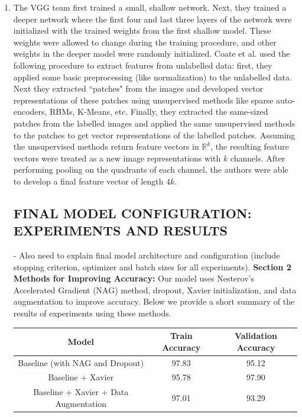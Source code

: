 \documentclass[a4paper]{article}
\begin{document}
\begin{enumerate}
{}
\item{ The VGG team first trained a small, shallow network. Next, they trained a deeper network where the first four and last three layers of the network were initialized with the trained weights from the first shallow model. These weights were allowed to change during the training procedure, and other weights in the deeper model were randomly initialized. 
\newline
\newline 
Coate et al. used the following procedure to extract features from unlabelled data: first, they applied some basic preprocessing (like normalization) to the unlabelled data. Next they extracted ``patches" from the images and developed vector representations of these patches using unsupervised methods like sparse auto-encoders, RBMs, K-Means, etc. Finally, they extracted the same-sized patches from the labelled images and applied the same unsupervised methods to the patches to get vector representations of the labelled patches. Assuming the unsupervised methods return feature vectors in $\mathbb{R}^k$, the resulting feature vectors were treated as a new image representations with $k$ channels. After performing pooling on the quadrants of each channel, the authors were able to develop a final feature vector of length $4k$. 

\subsection*{FINAL MODEL CONFIGURATION: EXPERIMENTS AND RESULTS}
- Also need to explain final model architecture and configuration (include stopping criterion, optimizer and batch sizes for all experiments).
\newline
\newline
\textbf{Section 2 Methods for Improving Accuracy:}
\newline
\newline
Our model uses Nesterov's Accelerated Gradient (NAG) method, dropout, Xavier initialization, and data augmentation to improve accuracy. Below we provide a short summary of the results of experiments using these methods. 

\begin{center}
\begin{tabular}{ |c|c|c| } 
 \hline
 Model & Train Accuracy & Validation Accuracy \\ \hline
 Baseline (with NAG and Dropout) & 97.83 & 95.12 \\ 
 Baseline + Xavier & 95.78 & 97.90 \\ 
 Baseline + Xavier + Data Augmentation & 97.01 & 93.29 \\ 
 \hline
\end{tabular}
\end{center}

}
\end{enumerate}
\end{document}
